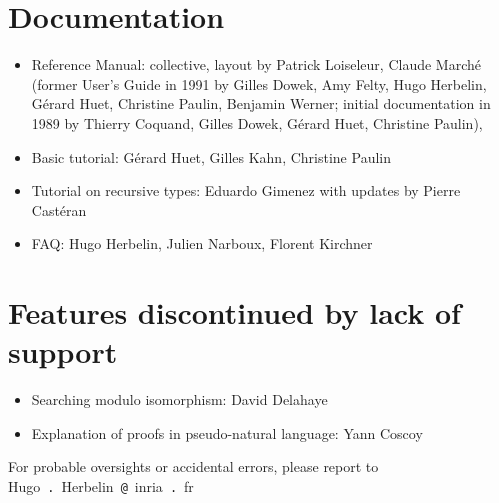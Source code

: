 \documentclass{article}
\begin{document}
\section{Documentation}

\begin{itemize}

\item Reference Manual: collective, layout by Patrick Loiseleur,
  Claude Marché (former User's Guide in 1991 by Gilles Dowek, Amy
  Felty, Hugo Herbelin, Gérard Huet, Christine Paulin, Benjamin
  Werner; initial documentation in 1989 by Thierry Coquand, Gilles
  Dowek, Gérard Huet, Christine Paulin),
\item Basic tutorial: Gérard Huet, Gilles Kahn, Christine Paulin
\item Tutorial on recursive types: Eduardo Gimenez with updates by Pierre Castéran
\item FAQ: Hugo Herbelin, Julien Narboux, Florent Kirchner
\end{itemize}

\section{Features discontinued by lack of support}

\begin{itemize}
\item Searching modulo isomorphism: David Delahaye
\item Explanation of proofs in pseudo-natural language: Yann Coscoy
\end{itemize}

For probable oversights or accidental errors, please report to Hugo~\verb=.=~Herbelin~\verb=@=~inria~\verb=.=~fr
\end{document}
